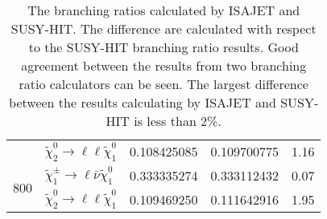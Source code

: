 \begin{table}[htb]
\begin{center}
{\begin{tabular}{clllc}
                                     & $\widetilde{\chi}^{0}_{2} \rightarrow \ell \ell \widetilde{\chi}^{0}_{1}$        & 0.108425085     & 0.109700775       & 1.16\\
                \multirow{2}{*}{800} & $\widetilde{\chi}^{\pm}_{1} \rightarrow \ell \bar{\nu} \widetilde{\chi}^{0}_{1}$ & 0.333335274     & 0.333112432       & 0.07\\
                                     & $\widetilde{\chi}^{0}_{2} \rightarrow \ell \ell \widetilde{\chi}^{0}_{1}$        & 0.109469250     & 0.111642916       & 1.95\\
                \hline
                \hline
            \end{tabular}
        }
    \end{center}
    \caption{The branching ratios calculated by \textsc{ISAJET} and SUSY-HIT.
    The difference are calculated with respect to the SUSY-HIT branching ratio results.
    Good agreement between the results from two branching ratio calculators can be seen.
    The largest difference between the results calculating by \textsc{ISAJET} and SUSY-HIT is less than 2\%. 
    }
    \label{tab:data_susy_hit}
\end{table}%

